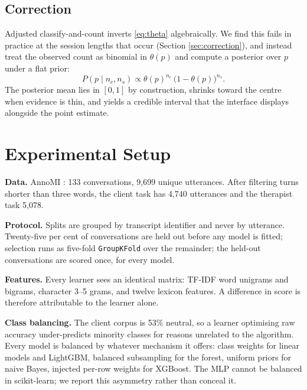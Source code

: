 \documentclass[conference]{IEEEtran}
\begin{document}
\subsection{Correction}
Adjusted classify-and-count inverts \eqref{eq:theta} algebraically. We find
this fails in practice at the session lengths that occur (Section
\ref{sec:correction}), and instead treat the observed count as binomial in
$\theta(p)$ and compute a posterior over $p$ under a flat prior:
\begin{equation}
P(p \mid n_c, n_s) \propto \theta(p)^{n_c}\,\bigl(1-\theta(p)\bigr)^{n_s}.
\end{equation}
The posterior mean lies in $[0,1]$ by construction, shrinks toward the centre
when evidence is thin, and yields a credible interval that the interface
displays alongside the point estimate.

\section{Experimental Setup}

\textbf{Data.} AnnoMI \cite{wu2023}: 133 conversations, 9{,}699 unique
utterances. After filtering turns shorter than three words, the client task
has 4{,}740 utterances and the therapist task 5{,}078.

\textbf{Protocol.} Splits are grouped by transcript identifier and never by
utterance. Twenty-five per cent of conversations are held out before any model
is fitted; selection runs as five-fold \texttt{GroupKFold} over the remainder;
the held-out conversations are scored once, for every model.

\textbf{Features.} Every learner sees an identical matrix: TF-IDF word
unigrams and bigrams, character 3--5 grams, and twelve lexicon features. A
difference in score is therefore attributable to the learner alone.

\textbf{Class balancing.} The client corpus is 53\% neutral, so a learner
optimising raw accuracy under-predicts minority classes for reasons unrelated
to the algorithm. Every model is balanced by whatever mechanism it offers:
class weights for linear models and LightGBM, balanced subsampling for the
forest, uniform priors for naive Bayes, injected per-row weights for XGBoost.
The MLP cannot be balanced in scikit-learn; we report this asymmetry rather
than conceal it.

\end{document}
